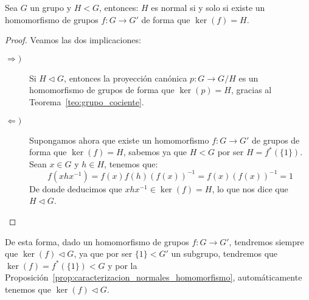 \begin{prop}\label{prop:caracterizacion_normales_homomorfismo}
    Sea $G$ un grupo y $H<G$, entonces: $H$ es normal si y solo si existe un homomorfismo de grupos $f:G\to G'$ de forma que $\ker(f) = H$.
    \begin{proof}
        Veamos las dos implicaciones:
        \begin{description}
            \item [$\Longrightarrow)$] Si $H\lhd G$, entonces la proyección canónica $p:G\to G/H$ es un homomorfismo de grupos de forma que $\ker(p) = H$, gracias al Teorema~\ref{teo:grupo_cociente}.
            \item [$\Longleftarrow)$] Supongamos ahora que existe un homomorfismo $f:G\to G'$ de grupos de forma que $\ker(f) = H$, sabemos ya que $H<G$ por ser $H = f^\ast(\{1\})$. Sean $x\in G$ y $h\in H$, tenemos que:
                \begin{equation*}
                    f(xhx^{-1}) = f(x)f(h){(f(x))}^{-1} = f(x) {(f(x))}^{-1} = 1
                \end{equation*}
                De donde deducimos que $xhx^{-1}\in \ker(f) = H$, lo que nos dice que $H\lhd G$. \qedhere
        \end{description}
    \end{proof}
\end{prop}
\begin{observacion}
    De esta forma, dado un homomorfismo de grupos $f:G\to G'$, tendremos siempre que $\ker(f) \lhd G$, ya que por ser $\{1\}<G'$ un subgrupo, tendremos que $\ker(f)=f^\ast(\{1\}) < G$ y por la Proposición~\ref{prop:caracterizacion_normales_homomorfismo}, automáticamente tenemos que $\ker(f) \lhd G$.
\end{observacion}

